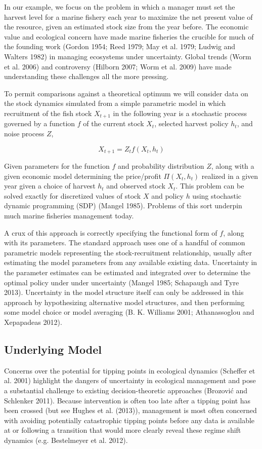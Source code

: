 \documentclass[author-year, review]{elsarticle} %
\begin{document}
In our example, we focus on the problem in which a manager must set the
harvest level for a marine fishery each year to maximize the net present
value of the resource, given an estimated stock size from the year
before. The economic value and ecological concern have made marine
fisheries the crucible for much of the founding work (Gordon 1954; Reed
1979; May et al. 1979; Ludwig and Walters 1982) in managing ecosystems
under uncertainty. Global trends (Worm et al. 2006) and controversy
(Hilborn 2007; Worm et al. 2009) have made understanding these
challenges all the more pressing.

To permit comparisons against a theoretical optimum we will consider
data on the stock dynamics simulated from a simple parametric model in
which recruitment of the fish stock $X_{t+1}$ in the following year is a
stochastic process governed by a function $f$ of the current stock
$X_t$, selected harvest policy $h_t$, and noise process $Z$,

\[X_{t+1} = Z_t f(X_t, h_t) \]

Given parameters for the function $f$ and probability distribution $Z$,
along with a given economic model determining the price/profit
$\Pi(X_t, h_t)$ realized in a given year given a choice of harvest $h_t$
and observed stock $X_t$. This problem can be solved exactly for
discretized values of stock $X$ and policy $h$ using stochastic dynamic
programming (SDP) (Mangel 1985). Problems of this sort underpin much
marine fisheries management today.

A crux of this approach is correctly specifying the functional form of
$f$, along with its parameters. The standard approach uses one of a
handful of common parametric models representing the stock-recruitment
relationship, usually after estimating the model parameters from any
available existing data. Uncertainty in the parameter estimates can be
estimated and integrated over to determine the optimal policy under
under uncertainty (Mangel 1985; Schapaugh and Tyre 2013). Uncertainty in
the model structure itself can only be addressed in this approach by
hypothesizing alternative model structures, and then performing some
model choice or model averaging (B. K. Williams 2001; Athanassoglou and
Xepapadeas 2012).

\subsection{Underlying Model}

Concerns over the potential for tipping points in ecological dynamics
(Scheffer et al. 2001) highlight the dangers of uncertainty in
ecological management and pose a substantial challenge to existing
decision-theoretic approaches (Brozović and Schlenker 2011). Because
intervention is often too late after a tipping point has been crossed
(but see Hughes et al. (2013)), management is most often concerned with
avoiding potentially catastrophic tipping points before any data is
available at or following a transition that would more clearly reveal
these regime shift dynamics (e.g. Bestelmeyer et al. 2012).
\end{document}
